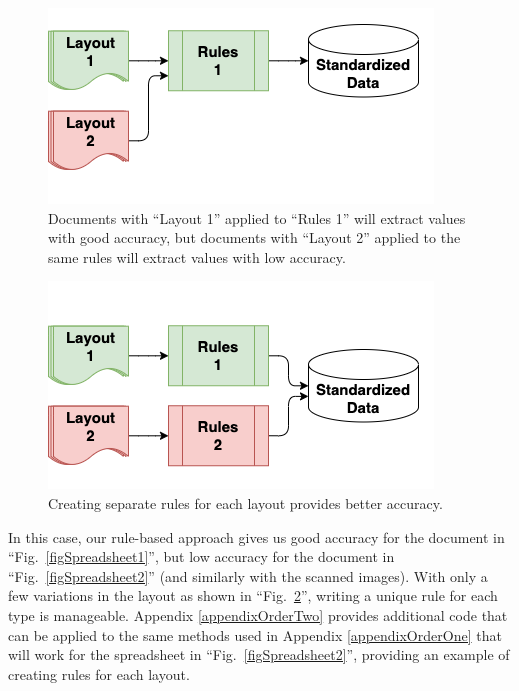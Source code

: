 \documentclass[conference, draftcls]{IEEEtran}
\begin{document}
\begin{figure}[ht]
\centerline{\includegraphics[width=\columnwidth]{RulesFlow2a.png}}
\caption{Documents with ``Layout 1'' applied to ``Rules 1'' will extract values with good accuracy, but documents with ``Layout 2'' applied to the same rules will extract values with low accuracy.}
\label{figRulesFlow2a}
\end{figure}

\begin{figure}[ht]
\centerline{\includegraphics[width=\columnwidth]{RulesFlow2b.png}}
\caption{Creating separate rules for each layout provides better accuracy.}
\label{figRulesFlow2b}
\end{figure}

In this case, our rule-based approach gives us good accuracy for the document in ``Fig.~\ref{figSpreadsheet1}'', but low accuracy for the document in ``Fig.~\ref{figSpreadsheet2}'' (and similarly with the scanned images). With only a few variations in the layout as shown in ``Fig.~\ref{figRulesFlow2b}'', writing a unique rule for each type is manageable. Appendix \ref{appendixOrderTwo} provides additional code that can be applied to the same methods used in Appendix \ref{appendixOrderOne} that will work for the spreadsheet in ``Fig.~\ref{figSpreadsheet2}'', providing an example of creating rules for each layout.
\end{document}
